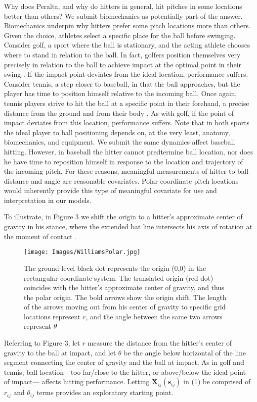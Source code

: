 Why does Peralta, and why do hitters in general, hit pitches in some locations better than others? We submit biomechanics as potentially part of the answer. Biomechanics underpin why hitters prefer some pitch locations more than others. Given the choice, athletes select a specific place for the ball before swinging. Consider golf, a sport where the ball is stationary, and the acting athlete chooses where to stand in relation to the ball. In fact, golfers position themselves very precisely in relation to the ball to achieve impact at the optimal point in their swing \citep{Cochran2005}. If the impact point deviates from the ideal location, performance suffers. Consider tennis, a step closer to baseball, in that the ball approaches, but the player has time to position himself relative to the incoming ball. Once again, tennis players strive to hit the ball at a specific point in their forehand, a precise distance from the ground and from their body \citep{Elliott2006}. As with golf, if the point of impact deviates from this location, performance suffers. Note that in both sports the ideal player to ball positioning depends on, at the very least, anatomy, biomechanics, and equipment. We submit the same dynamics affect baseball hitting. However, in baseball the hitter cannot predtermine ball location, nor does he have time to reposition himself in response to the location and trajectory of the incoming pitch. For these reasons, meaningful measurements of hitter to ball distance and angle are reasonable covariates. Polar coordinate pitch locations would inherently provide this type of meaningful covariate for use and interpretation in our models.

To illustrate, in Figure 3 we shift the origin to a hitter's approximate center of gravity in his stance, where the extended bat line intersects his axis of rotation at the moment of contact \citep{Welch1995}.


  \begin{figure}[H]
	\centering
	\texttt{[image: Images/WilliamsPolar.jpg]}
	\caption{The ground level black dot represents the origin (0,0) in the rectangular coordinate system. The translated origin (red dot) coincides with the hitter's approximate center of gravity, and thus the polar origin. The bold arrows show the origin shift. The length of the arrows moving out from his center of gravity to specific grid locations represent $r$, and the angle between the same two arrows represent $\protect\theta$}
	\end{figure}
Referring to Figure 3, let $r$ measure the distance from the hitter's center of gravity to the ball at impact, and let $\theta$ be the angle below horizontal of the line segment connecting the center of gravity and the ball at impact. As in golf and tennis, ball location---too far/close to the hitter, or above/below the ideal point of impact--- affects hitting performance. Letting $\pmb{X}_{ij}(\pmb{s}_{ij})$ in (1) be comprised of $r_{ij}$ and $\theta_{ij}$ terms provides an exploratory starting point.

